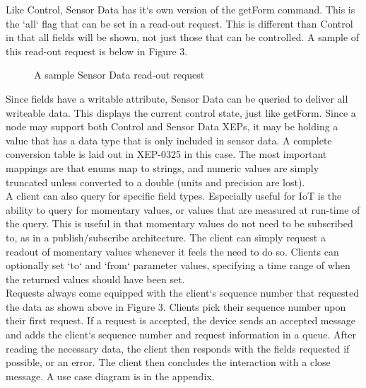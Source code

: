 Like Control, Sensor Data has it`s own version of the getForm command. This is the `all` flag that can be set in a read-out request. This is different than Control in that all fields will be shown, not just those that can be controlled. A sample of this read-out request is below in Figure 3.\\
\begin{figure}
\caption{A sample Sensor Data read-out request}
  
\end{figure}
Since fields have a writable attribute, Sensor Data can be queried to deliver all writeable data. This displays the current control state, just like getForm. Since a node may support both Control and Sensor Data XEPs, it may be holding a value that has a data type that is only included in sensor data. A complete conversion table is laid out in XEP-0325 in this case. The most important mappings are that enums map to strings, and numeric values are simply truncated unless converted to a double (units and precision are lost).\\
A client can also query for specific field types. Especially useful for IoT is the ability to query for momentary values, or values that are measured at run-time of the query. This is useful in that momentary values do not need to be subscribed to, as in a publish/subscribe architecture. The client can simply request a readout of momentary values whenever it feels the need to do so. Clients can optionally set `to` and `from` parameter values, specifying a time range of when the returned values should have been set.\\
Requests always come equipped with the client`s sequence number that requested the data as shown above in Figure 3. Clients pick their sequence number upon their first request. If a request is accepted, the device sends an accepted message and adds the client`s sequence number and request information in a queue. After reading the necessary data, the client then responds with the fields requested if possible, or an error. The client then concludes the interaction with a close message. A use case diagram is in the appendix.
